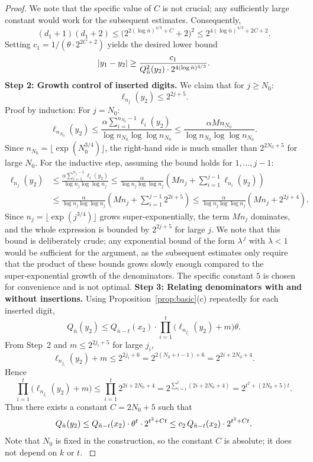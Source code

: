\documentclass{article}
\numberwithin{equation}{section}
\begin{document}
{\begin{proof}
{We note that the specific value of $C$ is not crucial; any sufficiently large constant would work for the subsequent estimates.
}
Consequently,
\[
(d_1+1)(d_1+2) \leq \bigl(2^{2(\log \bar{n})^{4/3}+C}+2\bigr)^2 \leq 2^{4(\log \bar{n})^{4/3}+2C+2}.
\]
Setting $c_1 = 1/(\theta \cdot 2^{2C+2})$ yields the desired lower bound
\begin{equation}
|y_1-y_2| \geq \frac{c_1}{Q_{\bar{n}}^2(y_2) \cdot 2^{4(\log \bar{n})^{4/3}}}. \label{tag{3.01}}
\end{equation}
\noindent\textbf{Step 2: Growth control of inserted digits.}
We claim that for $j \geq N_0$:
\[
\ell_{n_j}(y_2) \leq 2^{2j+5}.
\]
Proof by induction: For $j = N_0$:
\[
\ell_{n_{N_0}}(y_2) \leq \frac{\alpha \sum_{i=1}^{n_{N_0}-1} \ell_i(y_2)}{\log n_{N_0} \log \log n_{N_0}} \leq \frac{\alpha M n_{N_0}}{\log n_{N_0} \log \log n_{N_0}}.
\]
Since $n_{N_0} = \lfloor \exp(N_0^{3/4}) \rfloor$, the right-hand side is much smaller than $2^{2N_0+5}$ for large $N_0$.
%
For the inductive step, assuming the bound holds for $1, \ldots, j-1$:
\begin{align*}
\ell_{n_j}(y_2) &\leq \frac{\alpha \sum_{i=1}^{n_j-1} \ell_i(y_2)}{\log n_j \log \log n_j} \leq \frac{\alpha}{\log n_j \log \log n_j} \left( M n_j + \sum_{i=1}^{j-1} \ell_{n_i}(y_2) \right) \\
&\leq \frac{\alpha}{\log n_j \log \log n_j} \left( M n_j + \sum_{i=1}^{j-1} 2^{2i+5} \right) \leq \frac{\alpha}{\log n_j \log \log n_j} \left( M n_j + 2^{2j+4} \right).
\end{align*}
%
Since $n_j = \lfloor \exp(j^{3/4}) \rfloor$ grows super-exponentially, the term $M n_j$ dominates, and the whole expression is bounded by $2^{2j+5}$ for large $j$. 
{We note that this bound is deliberately crude; any exponential bound of the form   
\(\lambda^{\,j}\) with \(\lambda<1\) would be sufficient for the argument, as the subsequent estimates only require that the product of these bounds grows slowly enough compared to the super‑exponential growth of the denominators. The specific constant $5$ is chosen for convenience and is not optimal.
}
%
\newline
\noindent\textbf{Step 3: Relating denominators with and without insertions.}
Using Proposition~\ref{prop:basic}(c) repeatedly for each inserted digit,
\[
Q_{\bar{n}}(y_2) \leq Q_{\bar{n}-t}(x_2) \cdot \prod_{i=1}^{t} \bigl(\ell_{n_{j_i}}(y_2)+m\bigr)\theta .
\]
From Step~2 and $m \leq 2^{2j_i+5}$ for large $j_i$,
\[
\ell_{n_{j_i}}(y_2)+m \leq 2^{2j_i+6} = 2^{2(N_0+i-1)+6}=2^{2i+2N_0+4}.
\]
Hence
\[
\prod_{i=1}^{t}\bigl(\ell_{n_{j_i}}(y_2)+m\bigr) \leq \prod_{i=1}^{t} 2^{2i+2N_0+4}
= 2^{\sum_{i=1}^{t}(2i+2N_0+4)} = 2^{t^{2}+(2N_0+5)t}.
\]
Thus there exists a constant $C = 2N_0+5$ such that
\begin{equation}
Q_{\bar{n}}(y_2) \leq Q_{\bar{n}-t}(x_2) \cdot \theta^{t} \cdot 2^{t^{2}+Ct}
      \leq c_2\, Q_{\bar{n}-t}(x_2) \cdot 2^{t^{2}+Ct}. \label{tag{3.02}}
\end{equation}
%
{Note that $N_0$ is fixed in the construction, so the constant $C$ is absolute; it does not depend on $k$ or $t$.
}


\end{proof}}
\end{document}
